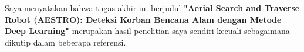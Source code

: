 
\begin{declaration}


Saya menyatakan bahwa tugas akhir ini berjudul \textbf{"Aerial Search and Traverse Robot (AESTRO): Deteksi Korban Bencana Alam dengan Metode Deep Learning"} merupakan hasil penelitian saya sendiri kecuali sebagaimana dikutip dalam beberapa referensi.


\end{declaration}

